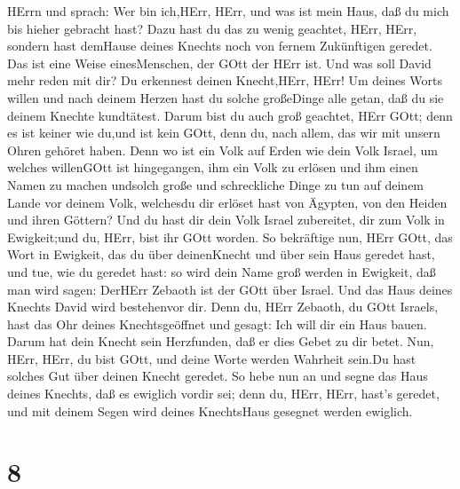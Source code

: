 HErrn und sprach: Wer bin ich,HErr, HErr, und was ist mein Haus, daß du
mich bis hieher gebracht hast?  Dazu hast du das zu wenig
geachtet, HErr, HErr, sondern hast demHause deines Knechts noch von
fernem Zukünftigen geredet. Das ist eine Weise einesMenschen, der GOtt
der HErr ist.  Und was soll David mehr reden mit dir? Du
erkennest deinen Knecht,HErr, HErr!  Um deines Worts willen
und nach deinem Herzen hast du solche großeDinge alle getan, daß du sie
deinem Knechte kundtätest.  Darum bist du auch groß
geachtet, HErr GOtt; denn es ist keiner wie du,und ist kein GOtt, denn
du, nach allem, das wir mit unsern Ohren gehöret haben. 
Denn wo ist ein Volk auf Erden wie dein Volk Israel, um welches
willenGOtt ist hingegangen, ihm ein Volk zu erlösen und ihm einen Namen
zu machen undsolch große und schreckliche Dinge zu tun auf deinem Lande
vor deinem Volk, welchesdu dir erlöset hast von Ägypten, von den Heiden
und ihren Göttern?  Und du hast dir dein Volk Israel
zubereitet, dir zum Volk in Ewigkeit;und du, HErr, bist ihr GOtt worden.
 So bekräftige nun, HErr GOtt, das Wort in Ewigkeit, das du
über deinenKnecht und über sein Haus geredet hast, und tue, wie du
geredet hast:  so wird dein Name groß werden in Ewigkeit,
daß man wird sagen: DerHErr Zebaoth ist der GOtt über Israel. Und das
Haus deines Knechts David wird bestehenvor dir.  Denn du,
HErr Zebaoth, du GOtt Israels, hast das Ohr deines Knechtsgeöffnet und
gesagt: Ich will dir ein Haus bauen. Darum hat dein Knecht sein
Herzfunden, daß er dies Gebet zu dir betet.  Nun, HErr,
HErr, du bist GOtt, und deine Worte werden Wahrheit sein.Du hast solches
Gut über deinen Knecht geredet.  So hebe nun an und segne
das Haus deines Knechts, daß es ewiglich vordir sei; denn du, HErr,
HErr, hast's geredet, und mit deinem Segen wird deines KnechtsHaus
gesegnet werden ewiglich.

\hypertarget{section-7}{%
\section{8}\label{section-7}}


